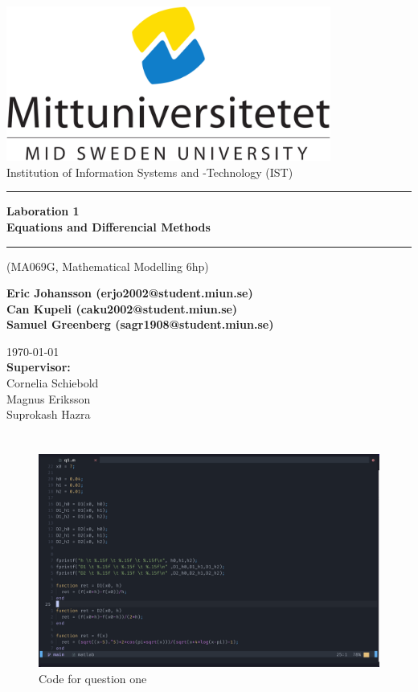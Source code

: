 \documentclass{article}
\makeatletter
\newcommand{\getauthor}{Eric Johansson (erjo2002@student.miun.se)\\Can Kupeli (caku2002@student.miun.se) \\Samuel Greenberg (sagr1908@student.miun.se)} %
\newcommand{\gettitle}{Laboration 1 \\Equations and Differencial Methods} %
\newcommand{\getcourse}{(MA069G, Mathematical Modelling 6hp)} %
\newcommand{\getsupervisor}{Cornelia Schiebold\\Magnus Eriksson\\Suprokash Hazra}
\makeatother
\begin{document}
  \begin{titlepage}
	\begin{center}
		\vspace*{1cm}

		\includegraphics[width=0.8\textwidth]{imgs/msu.png}\\[0.5cm]
		\Large
		Institution of Information Systems and -Technology (IST)\\[1cm]
		\Huge
		\rule{\textwidth}{1px}
		\textbf{\gettitle}
		\rule[0.5cm]{\textwidth}{1px}

		\large
		\getcourse{}
		\vspace{1cm}

        \Large
		\textbf{\getauthor}\\

		\vfill


		\vspace{0.8cm}

		\small
		\today \\
		\Large
		\textbf{Supervisor:}\\
		\getsupervisor{}

	\end{center}
\end{titlepage}
\tableofcontents
\newpage

  
\section{}

\begin{figure}[h]
	\centering
	\includegraphics[width=\textwidth]{imgs/q1_code.png}
	\caption{Code for question one}
	\label{fig:q1_code}
\end{figure}
\end{document}

